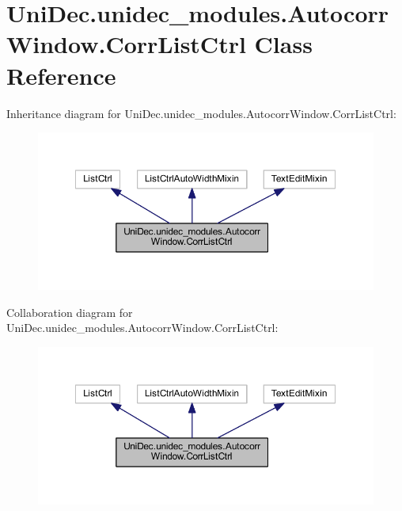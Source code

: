 \hypertarget{class_uni_dec_1_1unidec__modules_1_1_autocorr_window_1_1_corr_list_ctrl}{}\section{Uni\+Dec.\+unidec\+\_\+modules.\+Autocorr\+Window.\+Corr\+List\+Ctrl Class Reference}
\label{class_uni_dec_1_1unidec__modules_1_1_autocorr_window_1_1_corr_list_ctrl}


Inheritance diagram for Uni\+Dec.\+unidec\+\_\+modules.\+Autocorr\+Window.\+Corr\+List\+Ctrl\+:\nopagebreak
\begin{figure}[H]
\begin{center}
\leavevmode
\includegraphics[width=350pt]{class_uni_dec_1_1unidec__modules_1_1_autocorr_window_1_1_corr_list_ctrl__inherit__graph}
\end{center}
\end{figure}


Collaboration diagram for Uni\+Dec.\+unidec\+\_\+modules.\+Autocorr\+Window.\+Corr\+List\+Ctrl\+:\nopagebreak
\begin{figure}[H]
\begin{center}
\leavevmode
\includegraphics[width=350pt]{class_uni_dec_1_1unidec__modules_1_1_autocorr_window_1_1_corr_list_ctrl__coll__graph}
\end{center}
\end{figure}
